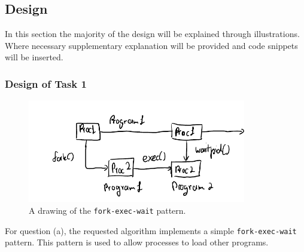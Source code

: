 \documentclass[12pt]{article}
\begin{document}
\begin{center}
\begin{minipage}[t]{0.3\textwidth}
\end{minipage}
\begin{minipage}[t]{0.3\textwidth}
\end{minipage}
\begin{minipage}[t]{0.3\textwidth}
\end{minipage}
\end{center}

\subsection{Design}

In this section the majority of the design will be explained
through illustrations. Where necessary supplementary explanation
will be provided and code snippets will be inserted.

\subsubsection{Design of Task 1}

\begin{figure}[H]
\centering
\includegraphics[height=4.5cm]{task1qa}
\caption{A drawing of the \texttt{fork-exec-wait} pattern.}
\end{figure}



For question (a), the requested algorithm implements a simple
\texttt{fork-exec-wait} pattern. This pattern is used to allow
processes to load other programs.
\end{document}
